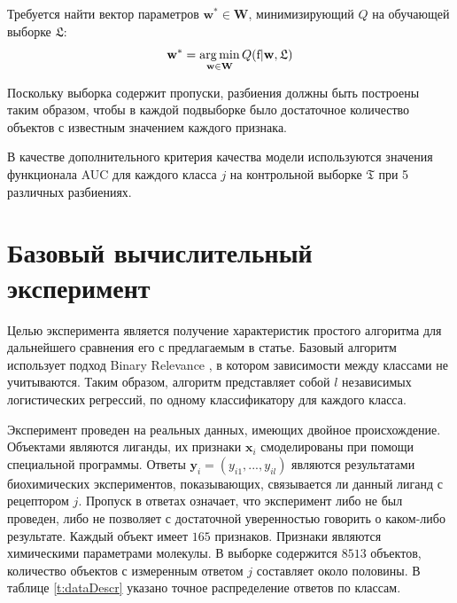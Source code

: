 \documentclass[12pt,twoside]{article}
\newcommand{\x}{\mathbf{x}}
\newcommand{\w}{\mathbf{w}}
\newcommand{\W}{\mathbf{W}}
\newcommand{\y}{\mathbf{y}}
\newcommand{\fs}{\mbox{f}}
\begin{document}
%

Требуется найти вектор параметров $\w^*\in\W$, минимизирующий $Q$ на обучающей выборке $\mathfrak{L}$:
	$$\w^*=\argmin_{\w\in\W}Q(\fs|\w,\mathfrak{L})$$

Поскольку выборка содержит пропуски, разбиения должны быть построены таким образом, чтобы в каждой подвыборке было достаточное количество объектов с известным значением каждого признака.

В качестве дополнительного критерия качества модели используются значения функционала AUC для каждого класса $j$ на контрольной выборке $\mathfrak{T}$ при 5 различных разбиениях. %
\section{Базовый вычислительный эксперимент}
Целью эксперимента является получение характеристик простого алгоритма для дальнейшего сравнения его с предлагаемым в статье. Базовый алгоритм использует подход Binary Relevance \cite{weiwei2010}, в котором зависимости между классами не учитываются. Таким образом, алгоритм представляет собой $l$ независимых логистических регрессий, по одному классификатору для каждого класса.

Эксперимент проведен на реальных данных, имеющих двойное происхождение. Объектами являются лиганды, их признаки $\x_i$ смоделированы при помощи специальной программы. Ответы $\y_i=(y_{i1},...,y_{il})$ являются результатами биохимических экспериментов, показывающих, связывается ли данный лиганд с рецептором $j$. Пропуск в ответах означает, что эксперимент либо не был проведен, либо не позволяет с достаточной уверенностью говорить о каком-либо результате. Каждый объект имеет $165$ признаков. Признаки являются химическими параметрами молекулы. В выборке содержится $8513$ объектов, количество объектов с измеренным ответом $j$ составляет около половины. В таблице \ref{t:dataDescr} указано точное распределение ответов по классам.
\end{document}
